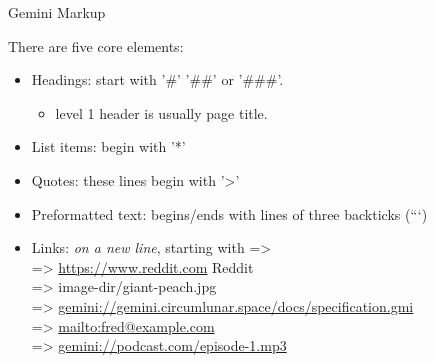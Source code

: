 \documentclass[presentation, 11pt,  aspectratio=169]{beamer}
\begin{document}
\begin{frame}[label={sec:orgaeb5a5e}]{Gemini Markup}
\begin{block}{There are five core elements:}
\begin{itemize}
\item \alert{Headings:} start with '\#' '\#\#' or '\#\#\#'.\\
\begin{itemize}
\item level 1 header is usually page title.\\
\end{itemize}
\item \alert{List items:} begin with '*'\\
\item \alert{Quotes:} these lines begin with '>'\\
\item \alert{Preformatted text:} begins/ends with lines of three backticks (```)\\
\end{itemize}
\pause
\begin{itemize}
\item \alert{Links:} \emph{on a new line}, starting with \alert{=>}\\
=> \url{https://www.reddit.com} Reddit\\
=> image-dir/giant-peach.jpg\\
=> \href{gemini://gemini.circumlunar.space/docs/specification.gmi}{gemini://gemini.circumlunar.space/docs/specification.gmi}\\
=> \url{mailto:fred@example.com}\\
=> \href{gemini://podcast.com/episode-1.mp3}{gemini://podcast.com/episode-1.mp3}\\
\end{itemize}
\end{block}
\end{frame}
\end{document}
